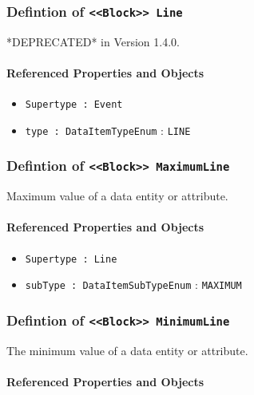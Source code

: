 \subsubsection{Defintion of \texttt{<<Block>> Line}}
  \label{type:Line}

\FloatBarrier

*DEPRECATED* in Version 1.4.0.

\FloatBarrier
\paragraph{Referenced Properties and Objects}

\begin{itemize}
\item \texttt{Supertype : Event}

\item \texttt{type : DataItemTypeEnum} : \texttt{LINE}

\end{itemize}
\FloatBarrier
\subsubsection{Defintion of \texttt{<<Block>> MaximumLine}}
  \label{type:MaximumLine}

\FloatBarrier

Maximum value of a data entity or attribute.

\FloatBarrier
\paragraph{Referenced Properties and Objects}

\begin{itemize}
\item \texttt{Supertype : Line}

\item \texttt{subType : DataItemSubTypeEnum} : \texttt{MAXIMUM}

\end{itemize}
\FloatBarrier
\subsubsection{Defintion of \texttt{<<Block>> MinimumLine}}
  \label{type:MinimumLine}

\FloatBarrier

The minimum value of a data entity or attribute.

\FloatBarrier
\paragraph{Referenced Properties and Objects}

